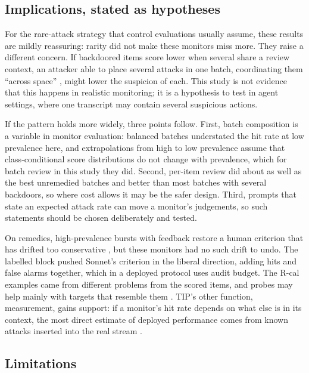 \documentclass[10pt]{article}
\begin{document}
\subsection{Implications, stated as hypotheses}\label{sec:implications}

For the rare-attack strategy that control evaluations usually assume, these results are mildly reassuring: rarity did not make these monitors miss more. They raise a different concern. If backdoored items score lower when several share a review context, an attacker able to place several attacks in one batch, coordinating them ``across space'' \citep[Sec.~6]{korbak2025}, might lower the suspicion of each. This study is not evidence that this happens in realistic monitoring; it is a hypothesis to test in agent settings, where one transcript may contain several suspicious actions.

If the pattern holds more widely, three points follow. First, batch composition is a variable in monitor evaluation: balanced batches understated the hit rate at low prevalence here, and extrapolations from high to low prevalence \citep{srivastav2026,abbasi2026} assume that class-conditional score distributions do not change with prevalence, which for batch review in this study they did. Second, per-item review did about as well as the best unremedied batches and better than most batches with several backdoors, so where cost allows it may be the safer design. Third, prompts that state an expected attack rate can move a monitor's judgements, so such statements should be chosen deliberately and tested.

On remedies, high-prevalence bursts with feedback restore a human criterion that has drifted too conservative \citep[Experiment~7]{wolfe2007}, but these monitors had no such drift to undo. The labelled block pushed Sonnet's criterion in the liberal direction, adding hits and false alarms together, which in a deployed protocol uses audit budget. The R-cal examples came from different problems from the scored items, and probes may help mainly with targets that resemble them \citep{becker2026}. TIP's other function, measurement, gains support: if a monitor's hit rate depends on what else is in its context, the most direct estimate of deployed performance comes from known attacks inserted into the real stream \citep{korbak2025,buser2025}.

\subsection{Limitations}\label{sec:limitations}
\end{document}
